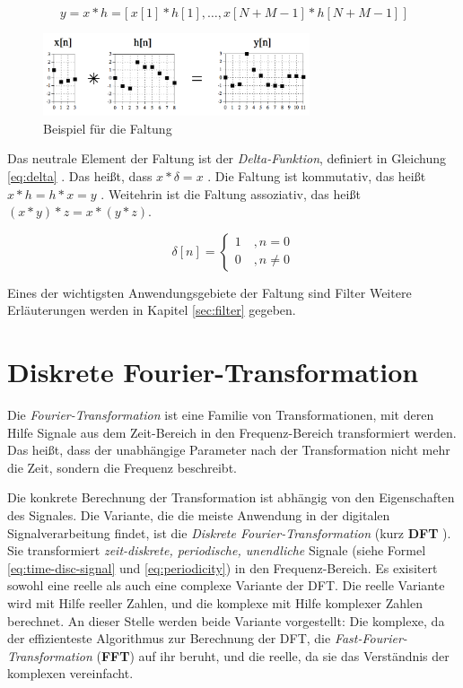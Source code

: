 \begin{equation}
y = x * h = \big[ \: x[1] * h[1] , \ldots , x[N+M-1] * h[N+M-1] \: \big]
\label{eq:convolution}
\end{equation}

\begin{figure}[h]
	\centering
	\includegraphics[width=0.7\textwidth]{bilder/convolutionExample.png}
	\caption{Beispiel für die Faltung}
	\label{img:convolutionExample}
\end{figure}

Das neutrale Element der Faltung ist der \emph{Delta-Funktion}, definiert in Gleichung \ref{eq:delta} . Das heißt, dass $x * \delta = x$ . Die Faltung ist kommutativ, das heißt $ x * h = h * x = y$ . \cite[S. 107, 113 ]{dspGuide} Weitehrin ist die Faltung assoziativ, das heißt $(x*y)*z=x*(y*z)$. \cite[S. 133]{dspGuide}

\begin{equation}
\delta[n] = 
\begin{cases}
1 \quad , n = 0\\
0 \quad ,  n \neq 0
\label{eq:delta}
\end{cases}
\end{equation}

Eines der wichtigsten Anwendungsgebiete der Faltung sind Filter Weitere Erläuterungen werden in Kapitel \ref{sec:filter} gegeben.


\section{Diskrete Fourier-Transformation}

Die \emph{Fourier-Transformation} ist eine Familie von Transformationen, mit deren Hilfe Signale aus dem Zeit-Bereich in den Frequenz-Bereich transformiert werden. Das heißt, dass der unabhängige Parameter nach der Transformation nicht mehr die Zeit, sondern die Frequenz beschreibt. 

Die konkrete Berechnung der Transformation ist abhängig von den Eigenschaften des Signales. Die Variante, die die meiste Anwendung in der digitalen Signalverarbeitung findet, ist die \emph{Diskrete Fourier-Transformation} (kurz \textbf{DFT} ). Sie transformiert \emph{zeit-diskrete, periodische, unendliche} Signale (siehe Formel \ref{eq:time-disc-signal} und \ref{eq:periodicity}) in den Frequenz-Bereich. Es exisitert sowohl eine reelle als auch eine complexe Variante der DFT. Die reelle Variante wird mit Hilfe reeller Zahlen, und die komplexe mit Hilfe komplexer Zahlen berechnet. An dieser Stelle werden beide Variante vorgestellt: Die komplexe, da der effizienteste Algorithmus zur Berechnung der DFT, die \emph{Fast-Fourier-Transformation} (\textbf{FFT}) auf ihr beruht, und die reelle, da sie das Verständnis der komplexen vereinfacht.\cite[S. 142 - 146]{dspGuide}

